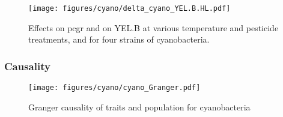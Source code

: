 \begin{figure}[hbt!]
    \centering
    \texttt{[image: figures/cyano/delta\_cyano\_YEL.B.HL.pdf]}
    \caption{Effects on pcgr and on YEL.B at various temperature and pesticide treatments, and for four strains of cyanobacteria.}
    \label{fig:delta_cyano_YEL.B.HL}
\end{figure}

\subsubsection{Causality}

\begin{figure}[hbt!]
    \centering
    \texttt{[image: figures/cyano/cyano\_Granger.pdf]}
    \caption{Granger causality of traits and population for cyanobacteria}
    \label{fig:cyano_grangerl}
\end{figure}

\clearpage

